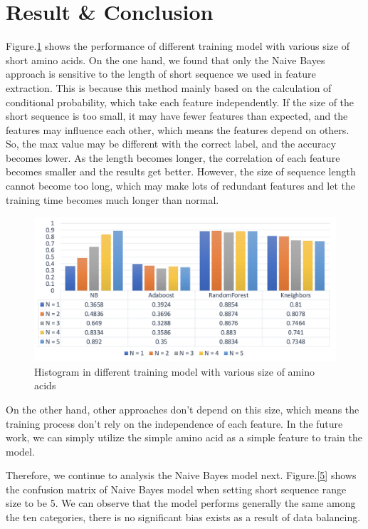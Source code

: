 \documentclass[sigconf]{acmart}
\begin{document}
\section{Result & Conclusion}
Figure.\ref{4} shows the performance of different training model with various size of short amino acids. On the one hand, we found that only the Naive Bayes approach is sensitive to the length of short sequence we used in feature extraction. This is because this method mainly based on the calculation of conditional probability, which take each feature independently. If the size of the short sequence is too small, it may have fewer features than expected, and the features may influence each other, which means the features depend on others. So, the max value may be different with the correct label, and the accuracy becomes lower. As the length becomes longer, the correlation of each feature becomes smaller and the results get better. However, the size of sequence length cannot become too long, which may make lots of redundant features and let the training time becomes much longer than normal.

\begin{figure}[h]
  \centering
  \includegraphics[width=\linewidth]{4.png}
  \caption{Histogram in different training model with various size of amino acids}
  \label{4}
\end{figure}

On the other hand, other approaches don’t depend on this size, which means the training process don’t rely on the independence of each feature. In the future work, we can simply utilize the simple amino acid as a simple feature to train the model.

Therefore, we continue to analysis the Naive Bayes model next. Figure.\ref{5} shows the confusion matrix of Naive Bayes model when setting short sequence range size to be 5. We can observe that the model performs generally the same among the ten categories, there is no significant bias exists as a result of data balancing.
\end{document}

